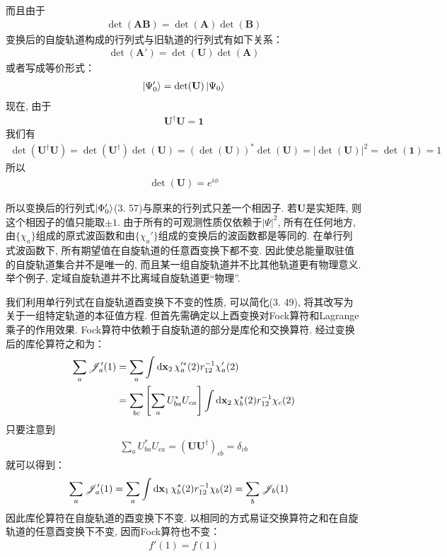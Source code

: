 而且由于
\begin{align}
	\det(\mathbf{AB}) = \det(\mathbf{A})\det(\mathbf{B})
\end{align}
变换后的自旋轨道构成的行列式与旧轨道的行列式有如下关系：
\begin{align}
	\det(\mathbf{A}') = \det(\mathbf{U})\det(\mathbf{A})
\end{align}
或者写成等价形式：
\begin{align}
	\Ket{\Psi_0'} = \det(\mathbf{U})\Ket{\Psi_0}
\end{align}
现在, 
由于
\begin{align}
	\mathbf{U}^\dagger\mathbf{U} = \mathbf{1}
\end{align}
我们有
\begin{align}
	\det(\mathbf{U}^\dagger\mathbf{U}) = \det(\mathbf{U}^\dagger)\det(\mathbf{U}) = (\det(\mathbf{U}))^*\det(\mathbf{U}) = |\det(\mathbf{U})|^2 = \det(\mathbf{1}) = 1
\end{align}
所以
\begin{align}
	\det(\mathbf{U}) = e^{i\phi}
\end{align}

所以变换后的行列式$\Ket{\Phi_0'}$(3.
57)与原来的行列式只差一个相因子. 
若$\mathbf{U}$是实矩阵, 
则这个相因子的值只能取$\pm 1$. 
由于所有的可观测性质仅依赖于$|\Psi|^2$, 
所有在任何地方, 
由$\{\chi_a\}$组成的原式波函数和由$\{\chi_a'\}$组成的变换后的波函数都是等同的. 
在单行列式波函数下, 
所有期望值在自旋轨道的任意酉变换下都不变. 
因此使总能量取驻值的自旋轨道集合并不是唯一的, 
而且某一组自旋轨道并不比其他轨道更有物理意义. 
举个例子, 
定域自旋轨道并不比离域自旋轨道更“物理”.


我们利用单行列式在自旋轨道酉变换下不变的性质, 
可以简化(3.
49), 
将其改写为关于一组特定轨道的本征值方程. 
但首先需确定以上酉变换对Fock算符和Lagrange乘子的作用效果. 
Fock算符中依赖于自旋轨道的部分是库伦和交换算符. 
经过变换后的库伦算符之和为：
\begin{align}
	\sum_a \scr{J}_a'(1) & = \sum_a\int\dd{x}_2\,\chi_a^{\prime*}(2)\twoe\chi_a'(2)\notag\\
	& = \sum_{bc}\left[ \sum_a U_{ba}^* U_{ca}\right]\int\dd{x}_2\,\chi_b^*(2)\twoe\chi_c(2)
\end{align}
只要注意到
\begin{align}
	\sum_a U_{ba}^* U_{ca} = (\mathbf{UU}^\dagger)_{cb} = \delta_{cb}
\end{align}
就可以得到：
\begin{align}
	\sum_a \scr{J}_a'(1) & = \sum_a\int\dd{x}_1\,\chi_b^{*}(2)\twoe\chi_b(2) = \sum_{b}\scr{J}_b(1)
\end{align}
因此库伦算符在自旋轨道的酉变换下不变. 
以相同的方式易证交换算符之和在自旋轨道的任意酉变换下不变, 
因而Fock算符也不变：
\begin{align}
	f'(1) = f(1)
\end{align}

